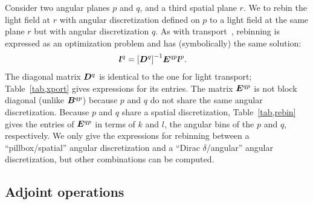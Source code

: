 Consider two angular planes $p$ and $q$, and a third spatial plane $r$.  We to
rebin the light field at $r$ with angular discretization defined on $p$ to a
light field at the same plane $r$ but with angular discretization $q$. As with
transport~, rebinning is expressed as an optimization problem
and has (symbolically) the same solution:
\begin{align}
    {\ensuremath{\bm{l}}}^q &=  {\left[ {\bm{D}}^q \right] }^{-1} {\bm{E}}^{qp} {\bm{l}}^p.
\end{align}
The diagonal matrix ${\bm{D}}^q$ is identical to the one for light transport;
Table~\ref{tab,xport} gives expressions for its entries.  The matrix ${\bm{E}}^{qp}$
is not block diagonal (unlike ${\bm{B}}^{qp}$) because $p$ and $q$ do not share the
same angular discretization.  Because $p$ and $q$ share a spatial
discretization, Table~\ref{tab,rebin} gives the entries of ${\bm{E}}^{qp}$ in terms
of $k$ and $l$, the angular bins of the $p$ and $q$, respectively.  We only
give the expressions for rebinning between a ``pillbox/spatial'' angular
discretization and a ``Dirac $\delta$/angular'' angular discretization, but
other combinations can be computed.





\subsection{Adjoint operations}

